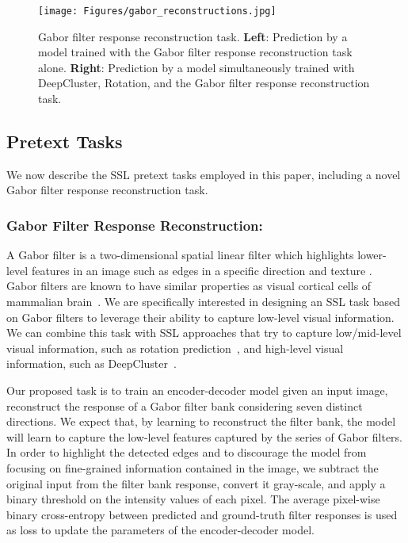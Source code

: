 \documentclass[runningheads]{llncs}
\begin{document}
\begin{figure}[t]
    \centering
    \texttt{[image: Figures/gabor\_reconstructions.jpg]}
    \caption{Gabor filter response reconstruction task. \textbf{Left}: Prediction by a model trained with the Gabor filter response reconstruction task alone.  \textbf{Right}: Prediction by a model simultaneously trained with DeepCluster, Rotation, and the Gabor filter response reconstruction task.} \label{fig:pretext_G}
\end{figure}

\subsection{Pretext Tasks}
We now describe the SSL pretext tasks employed in this paper, including a novel Gabor filter response reconstruction task. 




\vspace{-5pt}\subsubsection{Gabor Filter Response Reconstruction:}
A Gabor filter is a two-dimensional spatial linear filter which highlights lower-level features in an image such as edges in a specific direction and texture \cite{fogel1989gabor}. 
Gabor filters are known to have similar properties as visual cortical cells of mammalian brain~\cite{daugman1980two,daugman1985uncertainty}. We are specifically interested in designing an SSL task based on Gabor filters to leverage their ability to capture low-level visual information. We can combine this task with SSL approaches that try to capture low/mid-level visual information, such as rotation prediction~\cite{gidaris2018unsupervised}, and high-level visual information, such as DeepCluster~\cite{caron2018deep}. 

Our proposed task is to train an encoder-decoder model given an input image, reconstruct the response of a Gabor filter bank considering seven distinct directions. We expect that, by learning to reconstruct the filter bank, the model will learn to capture the low-level features captured by the series of Gabor filters. In order to highlight the detected edges and to discourage the model from focusing on fine-grained information contained in the image, we subtract the original input from the filter bank response, convert it gray-scale, and apply a binary threshold on the intensity values of each pixel. The average pixel-wise binary cross-entropy between predicted and ground-truth filter responses is used as loss to update the parameters of the encoder-decoder model. 
\end{document}

